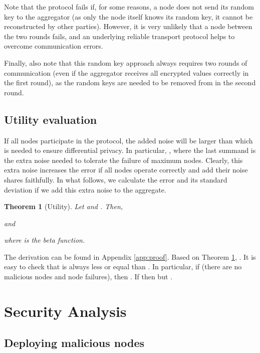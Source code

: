 \documentclass[11pt,a4paper]{article}
\theoremstyle{plain}
\theoremstyle{plain}
\newtheorem{theorem}{Theorem}
\theoremstyle{plain}
\theoremstyle{plain}
\theoremstyle{nonumberplain} \theoremseparator{}
\begin{document}
Note that the protocol fails if, for some reasons, a node does not send its random key to the aggregator (as only the node itself knows its random key, it cannot be reconstructed by other parties). However, it is very unlikely that a node between the two rounds fails, and an underlying reliable transport protocol helps to overcome communication errors. 

Finally, also note that this random key approach always requires two rounds of communication (even if the aggregator receives all encrypted values correctly in the first round), as the random keys are needed to be removed from  in the second round. 


\subsection{Utility evaluation}
\label{sec:extra_noise}

If all  nodes participate in the protocol, the added noise will
be larger than  which is needed to ensure differential privacy. 
In particular, , where
the last summand is the extra noise needed to tolerate the failure of maximum  nodes. Clearly, this extra noise increases the error if all  nodes operate correctly and add their noise shares faithfully. In what follows, we calculate the error and its standard deviation if we add this extra noise to the aggregate.


\begin{theorem}[Utility]
\label{thm:utility}
Let  and . Then,
 
and 

where  is the beta function.
\end{theorem}

The derivation can be found in Appendix \ref{app:proof}.  
Based on Theorem \ref{thm:utility}, 
. It is easy to check that  is always less or equal than . In particular, if  (there are no malicious nodes and node failures), then . If  then  but . 







\section{Security Analysis}

\subsection{Deploying malicious nodes}
\end{document}
